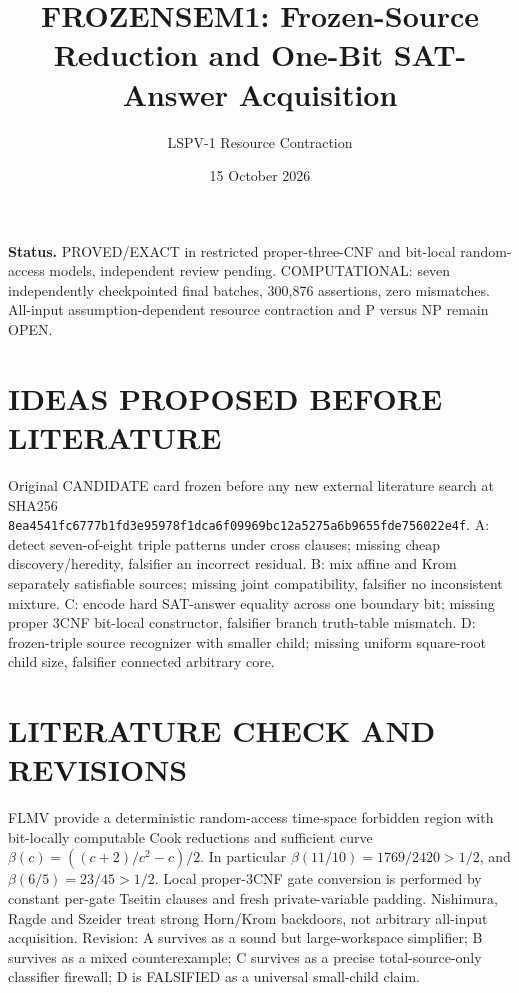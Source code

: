 \documentclass[11pt]{article}
\title{FROZENSEM1: Frozen-Source Reduction and One-Bit SAT-Answer Acquisition}
\author{LSPV-1 Resource Contraction}
\date{15 October 2026}
\begin{document}
\maketitle
\noindent\textbf{Status.} PROVED/EXACT in restricted proper-three-CNF and bit-local random-access models, independent review pending. COMPUTATIONAL: seven independently checkpointed final batches, 300,876 assertions, zero mismatches. All-input assumption-dependent resource contraction and P versus NP remain OPEN.
\section{IDEAS PROPOSED BEFORE LITERATURE}
Original CANDIDATE card frozen before any new external literature search at SHA256 \texttt{8ea4541fc6777b1fd3e95978f1dca6f09969bc12a5275a6b9655fde756022e4f}. A: detect seven-of-eight triple patterns under cross clauses; missing cheap discovery/heredity, falsifier an incorrect residual. B: mix affine and Krom separately satisfiable sources; missing joint compatibility, falsifier no inconsistent mixture. C: encode hard SAT-answer equality across one boundary bit; missing proper 3CNF bit-local constructor, falsifier branch truth-table mismatch. D: frozen-triple source recognizer with smaller child; missing uniform square-root child size, falsifier connected arbitrary core.
\section{LITERATURE CHECK AND REVISIONS}
FLMV \cite{FLMV} provide a deterministic random-access time-space forbidden region with bit-locally computable Cook reductions and sufficient curve \(\beta(c)=((c+2)/c^2-c)/2\). In particular \(\beta(11/10)=1769/2420>1/2\), and \(\beta(6/5)=23/45>1/2\). Local proper-3CNF gate conversion is performed by constant per-gate Tseitin clauses and fresh private-variable padding. Nishimura, Ragde and Szeider \cite{NRS} treat strong Horn/Krom backdoors, not arbitrary all-input acquisition. Revision: A survives as a sound but large-workspace simplifier; B survives as a mixed counterexample; C survives as a precise total-source-only classifier firewall; D is FALSIFIED as a universal small-child claim.
\end{document}
